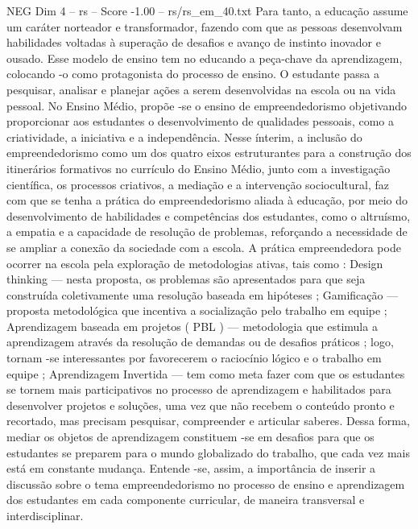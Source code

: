 \begin{textsample}{NEG Dim 4 – rs – Score -1.00 – rs/rs\_em\_40.txt}
Para tanto, a educação assume um caráter norteador e transformador, fazendo com que as pessoas desenvolvam habilidades voltadas à superação de desafios e avanço de instinto inovador e ousado.
Esse modelo de ensino tem no educando a peça-chave da aprendizagem, colocando -o como protagonista do processo de ensino.
O estudante passa a pesquisar, analisar e planejar ações a serem desenvolvidas na escola ou na vida pessoal.
No Ensino Médio, propõe -se o ensino de empreendedorismo objetivando proporcionar aos estudantes o desenvolvimento de qualidades pessoais, como a criatividade, a iniciativa e a independência.
Nesse ínterim, a inclusão do empreendedorismo como um dos quatro eixos estruturantes para a construção dos itinerários formativos no currículo do Ensino Médio, junto com a investigação científica, os processos criativos, a mediação e a intervenção sociocultural, faz com que se tenha a prática do empreendedorismo aliada à educação, por meio do desenvolvimento de habilidades e competências dos estudantes, como o altruísmo, a empatia e a capacidade de resolução de problemas, reforçando a necessidade de se ampliar a conexão da sociedade com a escola.
A prática empreendedora pode ocorrer na escola pela exploração de metodologias ativas, tais como : Design thinking — nesta proposta, os problemas são apresentados para que seja construída coletivamente uma resolução baseada em hipóteses ; Gamificação — proposta metodológica que incentiva a socialização pelo trabalho em equipe ; Aprendizagem baseada em projetos ( PBL ) — metodologia que estimula a aprendizagem através da resolução de demandas ou de desafios práticos ; logo, tornam -se interessantes por favorecerem o raciocínio lógico e o trabalho em equipe ; Aprendizagem Invertida — tem como meta fazer com que os estudantes se tornem mais participativos no processo de aprendizagem e habilitados para desenvolver projetos e soluções, uma vez que não recebem o conteúdo pronto e recortado, mas precisam pesquisar, compreender e articular saberes.
Dessa forma, mediar os objetos de aprendizagem constituem -se em desafios para que os estudantes se preparem para o mundo globalizado do trabalho, que cada vez mais está em constante mudança.
Entende -se, assim, a importância de inserir a discussão sobre o tema empreendedorismo no processo de ensino e aprendizagem dos estudantes em cada componente curricular, de maneira transversal e interdisciplinar.

\end{textsample}
